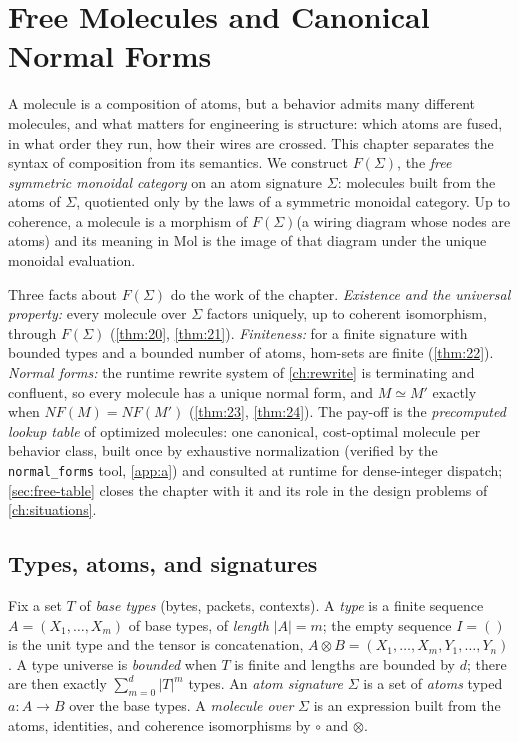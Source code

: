 \chapter{Free Molecules and Canonical Normal Forms}\label{ch:free}

A molecule is a composition of atoms, but a behavior admits many different
molecules, and what matters for engineering is structure: which atoms are
fused, in what order they run, how their wires are crossed. This chapter
separates the syntax of composition from its semantics. We construct
$F (\Sigma)$, the \emph{free symmetric monoidal category} on an atom signature
$\Sigma$: molecules built from the atoms of $\Sigma$, quotiented only by the
laws of a symmetric monoidal category. Up to coherence, a molecule is a
morphism of $F (\Sigma)$(a wiring diagram whose nodes are atoms) and its
meaning in Mol is the image of that diagram under the unique monoidal
evaluation.

Three facts about $F (\Sigma)$ do the work of the chapter. \emph{Existence and
the universal property:} every molecule over $\Sigma$ factors uniquely, up to
coherent isomorphism, through $F (\Sigma)$ (\autoref{thm:20}, \autoref{thm:21}). \emph{Finiteness:} for
a finite signature with bounded types and a bounded number of atoms, hom-sets
are finite (\autoref{thm:22}). \emph{Normal forms:} the runtime rewrite system of
\autoref{ch:rewrite} is terminating and confluent, so every molecule has a
unique normal form, and $M \simeq M'$ exactly when $\mathit{NF} (M) =
\mathit{NF} (M')$ (\autoref{thm:23}, \autoref{thm:24}). The pay-off is the \emph{precomputed lookup
table} of optimized molecules: one canonical, cost-optimal molecule per
behavior class, built once by exhaustive normalization (verified by the
\texttt{normal\_forms} tool, \autoref{app:a}) and consulted at runtime for
dense-integer dispatch; \autoref{sec:free-table} closes the chapter with it
and its role in the design problems of \autoref{ch:situations}.

\section{Types, atoms, and signatures}\label{sec:free-types}

\begin{definition}\label{def:types}
Fix a set $T$ of \emph{base types} (bytes, packets, contexts). A \emph{type}
is a finite sequence $A = (X_1,\dots,X_m)$ of base types, of \emph{length}
$|A| = m$; the empty sequence $I = ()$ is the unit type and the tensor is
concatenation, $A \otimes B = (X_1,\dots,X_m,Y_1,\dots,Y_n)$. A type universe
is \emph{bounded} when $T$ is finite and lengths are bounded by $d$; there
are then exactly $\sum_{m=0}^{d}|T|^m$ types. An \emph{atom signature}
$\Sigma$ is a set of \emph{atoms} typed $a \colon A \to B$ over the base
types. A \emph{molecule over} $\Sigma$ is an expression built from the atoms,
identities, and coherence isomorphisms by $\circ$ and $\otimes$.
\end{definition}

